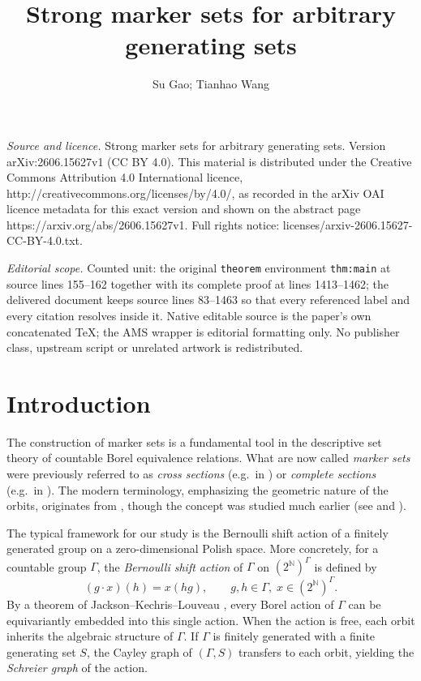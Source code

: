\documentclass[10pt,a4paper]{amsart}
\begin{document}
\title[Strong marker sets for arbitrary generating sets]{Strong marker sets for arbitrary generating sets}
\author{Su Gao; Tianhao Wang}
\date{}
\maketitle
\noindent\emph{Source and licence.} Strong marker sets for arbitrary generating sets. Version arXiv:2606.15627v1 (CC BY 4.0). This material is distributed under the Creative Commons Attribution 4.0 International licence, http://creativecommons.org/licenses/by/4.0/, as recorded in the arXiv OAI licence metadata for this exact version and shown on the abstract page https://arxiv.org/abs/2606.15627v1. Full rights notice: licenses/arxiv-2606.15627-CC-BY-4.0.txt.\par\smallskip
\noindent\textit{Editorial scope.} Counted unit: the original \texttt{theorem} environment \texttt{thm:main} at source lines 155--162 together with its complete proof at lines 1413--1462; the delivered document keeps source lines 83--1463 so that every referenced label and every citation resolves inside it. Native editable source is the paper's own concatenated TeX; the AMS wrapper is editorial formatting only. No publisher class, upstream script or unrelated artwork is redistributed.
\section{Introduction}

The construction of marker sets is a fundamental tool in the descriptive set
theory of countable Borel equivalence relations. What are now called
{\em marker sets} were previously referred to as {\em cross sections}
(e.g.\ in \cite{We84}) or {\em complete sections} (e.g.\ in \cite{DJK94}).
The modern terminology, emphasizing the geometric nature of the orbits,
originates from \cite{JKL02}, though the concept was studied much earlier
(see \cite{SS88} and \cite{BK96}).

The typical framework for our study is the Bernoulli shift action of a
finitely generated group on a zero-dimensional Polish space. More concretely,
for a countable group $\Gamma$, the {\em Bernoulli shift action} of $\Gamma$
on $(2^{\mathbb{N}})^\Gamma$ is defined by
\[
(g\cdot x)(h)=x(hg),\qquad g,h\in\Gamma,\; x\in (2^{\mathbb{N}})^\Gamma.
\]
By a theorem of Jackson--Kechris--Louveau \cite[Proposition 4.2]{JKL02},
every Borel action of $\Gamma$ can be equivariantly embedded into this single
action. When the action is free, each orbit inherits the algebraic structure
of $\Gamma$. If $\Gamma$ is finitely generated with a finite generating
set $S$, the Cayley graph of $(\Gamma, S)$ transfers to each orbit, yielding
the {\em Schreier graph} of the action.
\end{document}
